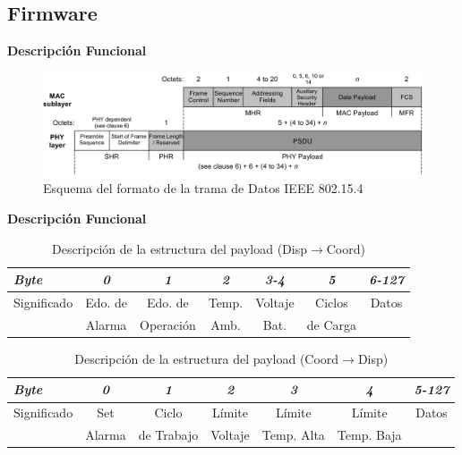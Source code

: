 \documentclass[aspectratio=43, handout]{beamer}
\begin{document}
\subsection[Firmware]{Firmware}

\begin{frame}{\textbf{\LARGE{Descripción Funcional}}}
\begin{figure}
	\centering
    \includegraphics[width=1\textwidth]{./imagenes/data.jpg}
    	\caption{Esquema del formato de la trama de Datos IEEE 802.15.4}
\end{figure}
\end{frame}

\begin{frame}{\textbf{\LARGE{Descripción Funcional}}}
\begin{table}[ht]
	\centering
	\caption{Descripción de la estructura del payload (Disp$\rightarrow$Coord)}
	\begin{tabular}{@{} l *6c @{}}    %
		\emph{\textbf{Byte}} & \emph{\textbf{0}} & \emph{\textbf{1}} & \emph{\textbf{2}} & \emph{\textbf{3-4}} & \emph{\textbf{5}} & \emph{\textbf{6-127}}\\
		\hline
		Significado & Edo. de & Edo. de & Temp. & Voltaje & Ciclos & Datos\\
		 & Alarma & Operación & Amb. & Bat. & de Carga & \\
		\hline
	\end{tabular}
	\label{tab:dispcoor}
\end{table}
\begin{table}[ht]
	\centering
	\caption{Descripción de la estructura del payload (Coord$\rightarrow$Disp)}
	\begin{tabular}{@{} l *6c @{}}    %
		\emph{\textbf{Byte}} & \emph{\textbf{0}} & \emph{\textbf{1}} & \emph{\textbf{2}} & \emph{\textbf{3}} & \emph{\textbf{4}} & \emph{\textbf{5-127}}\\
		\hline
		Significado & Set & Ciclo & Límite & Límite & Límite & Datos\\
		 & Alarma & de Trabajo & Voltaje & Temp. Alta & Temp. Baja & \\
		\hline
	\end{tabular}
	\label{tab:coordisp}
\end{table}
\end{frame}
\end{document}
